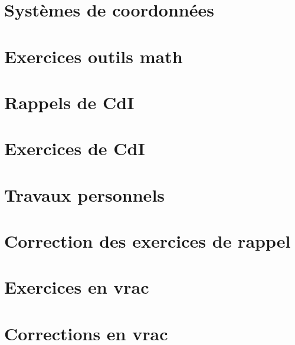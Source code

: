


\makeindex







\tableofcontents



\chapter{Systèmes de coordonnées}


\chapter{Exercices outils math}


\chapter{Rappels de CdI}



\chapter{Exercices de CdI}



\chapter{Travaux personnels}


\chapter{Correction des exercices de rappel}


\chapter{Exercices en vrac}



 

\chapter{Corrections en vrac}



